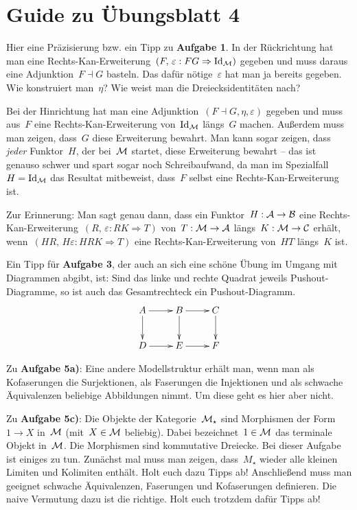 \documentclass{uebblatt}
\begin{document}
\section*{Guide zu Übungsblatt 4}

Hier eine Präzisierung bzw. ein Tipp zu \textbf{Aufgabe 1}. In der Rückrichtung
hat man eine Rechts-Kan-Erweiterung~$(F,\,\varepsilon : F G \Rightarrow \mathrm{Id}_{\mathcal{M}})$
gegeben und muss daraus eine Adjunktion~$F \dashv G$ basteln. Das dafür
nötige~$\varepsilon$ hat man ja bereits gegeben. Wie konstruiert man~$\eta$?
Wie weist man die Dreiecksidentitäten nach?

Bei der Hinrichtung hat man eine Adjunktion~$(F \dashv G, \eta, \varepsilon)$
gegeben und muss aus~$F$ eine Rechts-Kan-Erweiterung von~$\mathrm{Id}_{\mathcal{M}}$ längs~$G$
machen. Außerdem muss man zeigen, dass~$G$ diese Erweiterung bewahrt. Man kann
sogar zeigen, dass \emph{jeder} Funktor~$H$, der bei~$\mathcal{M}$ startet, diese
Erweiterung bewahrt -- das ist genauso schwer und spart sogar noch
Schreibaufwand, da man im Spezialfall~$H = \mathrm{Id}_{\mathcal{M}}$ das Resultat mitbeweist,
dass~$F$ selbst eine Rechts-Kan-Erweiterung ist.

Zur Erinnerung: Man sagt genau dann, dass ein Funktor~$H : \mathcal{A} \to \mathcal{B}$ eine
Rechts-Kan-Erweiterung~$(R,\,\varepsilon : RK \Rightarrow T)$ von~$T : \mathcal{M} \to
\mathcal{A}$ längs~$K : \mathcal{M} \to \mathcal{C}$ erhält, wenn~$(HR,\,H\varepsilon : HRK \Rightarrow
T)$ eine Rechts-Kan-Erweiterung von~$HT$ längs~$K$ ist.

Ein Tipp für \textbf{Aufgabe 3}, der auch an sich eine schöne Übung im Umgang
mit Diagrammen abgibt, ist: Sind das linke und rechte Quadrat jeweils
Pushout-Diagramme, so ist auch das Gesamtrechteck ein Pushout-Diagramm.
\[ \xymatrix{
  A \ar[r]\ar[d] & B \ar[r]\ar[d] & C \ar[d] \\
  D \ar[r] & E \ar[r] & F
} \]

Zu \textbf{Aufgabe 5a)}: Eine andere Modellstruktur erhält man, wenn man als
Kofaserungen die Surjektionen, als Faserungen die Injektionen und als schwache
Äquivalenzen beliebige Abbildungen nimmt. Um diese geht es hier aber nicht.

Zu \textbf{Aufgabe 5c)}: Die Objekte der Kategorie~$\mathcal{M}_\star$ sind Morphismen der
Form~$1 \to X$ in~$\mathcal{M}$ (mit~$X \in \mathcal{M}$ beliebig). Dabei bezeichnet~$1 \in \mathcal{M}$
das terminale Objekt in~$\mathcal{M}$. Die Morphismen sind kommutative Dreiecke.
Bei dieser Aufgabe ist einiges zu tun. Zunächst mal muss man zeigen,
dass~$M_\star$ wieder alle kleinen Limiten und Kolimiten enthält. Holt euch
dazu Tipps ab! Anschließend muss man geeignet schwache Äquivalenzen, Faserungen
und Kofaserungen definieren. Die naive Vermutung dazu ist die richtige. Holt
euch trotzdem dafür Tipps ab!
\end{document}
